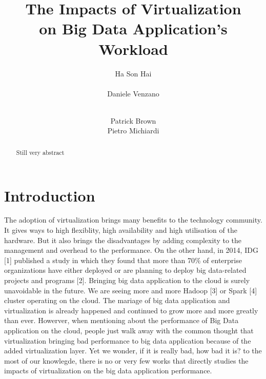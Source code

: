 \documentclass{acmsig}
\begin{document}
\title{The Impacts of Virtualization\\ on Big Data Application's Workload}


\author{
\alignauthor
Ha Son Hai\\
       \\
\alignauthor
Daniele Venzano\\
       \\
\and
\alignauthor
Patrick Brown
       \\
\alignauthor
Pietro Michiardi
       \\
}

\maketitle


\begin{abstract}
Still very abstract
\end{abstract}

\section{Introduction}

The adoption of virtualization brings many benefits to the technology community. It gives ways to high flexiblity, high availability and high utilisation of the hardware. But it also brings the disadvantages by adding complexity to the management and overhead to the performance. On the other hand, in 2014, IDG [1] published a study in which they found that more than 70\% of enterprise organizations have either deployed or are planning to deploy big data-related projects and programs [2]. Bringing big data application to the cloud is surely unavoidable in the future. We are seeing more and more Hadoop [3] or Spark [4] cluster operating on the cloud. The mariage of big data application and virtualization is already happened and continued to grow more and more greatly than ever. Howerver, when mentioning about the performance of Big Data application on the cloud, people just walk away with the common thought that virtualization bringing bad performance to big data application because of the added virtualization layer. Yet we wonder, if it is really bad, how bad it is? to the most of our knowlegde, there is no or very few works that directly studies the impacts of virtualization on the big data application performance.
\end{document}
